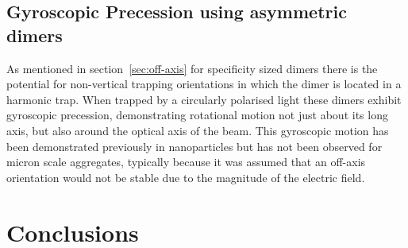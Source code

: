 \subsection{Gyroscopic Precession using asymmetric dimers}
As mentioned in section~\ref{sec:off-axis} for specificity sized dimers there is the potential for non-vertical trapping orientations in which the dimer is located in a harmonic trap. When trapped by a circularly polarised light these dimers exhibit gyroscopic precession, demonstrating rotational motion not just about its long axis, but also around the optical axis of the beam. This gyroscopic motion has been demonstrated previously in nanoparticles \cite{Zhu2021, Rashid2018, Hoang2016, Kuhn2016} but has not been observed for micron scale aggregates, typically because it was assumed that an off-axis orientation would not be stable due to the magnitude of the electric field. 



\section{Conclusions}
